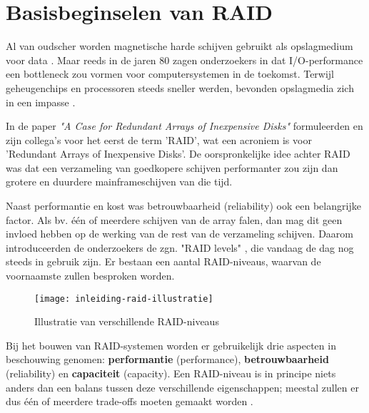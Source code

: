 \section{Basisbeginselen van RAID}

Al van oudscher worden magnetische harde schijven gebruikt als opslagmedium voor data \autocite{Goda2012}. Maar reeds in de jaren 80 zagen onderzoekers in dat I/O-performance een bottleneck zou vormen voor computersystemen in de toekomst. Terwijl geheugenchips en processoren steeds sneller werden, bevonden opslagmedia zich in een impasse \autocite{DavidA.Paterson1987}.

In de paper \textit{"A Case for Redundant Arrays of Inexpensive Disks"}  formuleerden \textcite{DavidA.Paterson1987} en zijn collega's voor het eerst de term 'RAID', wat een acroniem is voor 'Redundant Arrays of Inexpensive Disks'. De oorspronkelijke idee achter RAID was dat een verzameling van goedkopere schijven performanter zou zijn dan grotere en duurdere mainframeschijven van die tijd. 

Naast performantie en kost was betrouwbaarheid (reliability)  ook een belangrijke factor. Als bv. één of meerdere schijven van de array falen, dan mag dit geen invloed hebben op de werking van de rest van de verzameling schijven. Daarom introduceerden de onderzoekers de zgn. "RAID levels"    \autocite{DavidA.Paterson1987}, die vandaag de dag nog steeds in gebruik zijn. Er bestaan een aantal RAID-niveaus, waarvan de voornaamste zullen besproken worden.

\begin{figure}
	\centering
	\texttt{[image: inleiding-raid-illustratie]}
	\caption{Illustratie van verschillende RAID-niveaus \autocite{Chen1994}}
	\label{fig:chen_array_illustratie}
\end{figure}

Bij het bouwen van RAID-systemen worden er gebruikelijk drie aspecten in beschouwing genomen: \textbf{performantie} (performance), \textbf{betrouwbaarheid} (reliability) en \textbf{capaciteit} (capacity). Een RAID-niveau is in principe niets anders dan een balans tussen deze verschillende eigenschappen; meestal zullen er dus één of meerdere trade-offs moeten gemaakt worden \autocite{Chen1994}.

